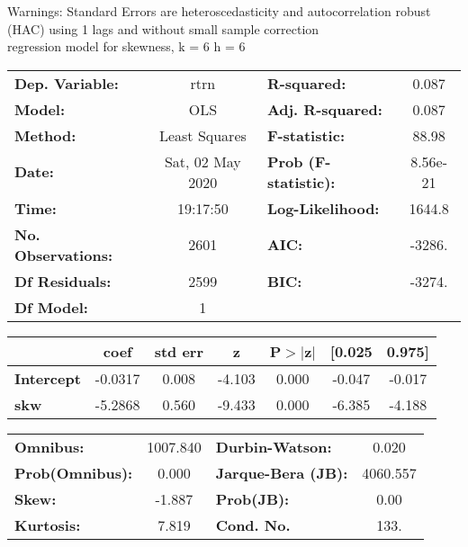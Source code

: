 Warnings: \newline
 [1] Standard Errors are heteroscedasticity and autocorrelation robust (HAC) using 1 lags and without small sample correction\\ 

regression model for skewness, k = 6 h = 6\begin{center}
\begin{tabular}{lclc}
\toprule
\textbf{Dep. Variable:}    &       rtrn       & \textbf{  R-squared:         } &     0.087   \\
\textbf{Model:}            &       OLS        & \textbf{  Adj. R-squared:    } &     0.087   \\
\textbf{Method:}           &  Least Squares   & \textbf{  F-statistic:       } &     88.98   \\
\textbf{Date:}             & Sat, 02 May 2020 & \textbf{  Prob (F-statistic):} &  8.56e-21   \\
\textbf{Time:}             &     19:17:50     & \textbf{  Log-Likelihood:    } &    1644.8   \\
\textbf{No. Observations:} &        2601      & \textbf{  AIC:               } &    -3286.   \\
\textbf{Df Residuals:}     &        2599      & \textbf{  BIC:               } &    -3274.   \\
\textbf{Df Model:}         &           1      & \textbf{                     } &             \\
\bottomrule
\end{tabular}
\begin{tabular}{lcccccc}
                   & \textbf{coef} & \textbf{std err} & \textbf{z} & \textbf{P$> |$z$|$} & \textbf{[0.025} & \textbf{0.975]}  \\
\midrule
\textbf{Intercept} &      -0.0317  &        0.008     &    -4.103  &         0.000        &       -0.047    &       -0.017     \\
\textbf{skw}       &      -5.2868  &        0.560     &    -9.433  &         0.000        &       -6.385    &       -4.188     \\
\bottomrule
\end{tabular}
\begin{tabular}{lclc}
\textbf{Omnibus:}       & 1007.840 & \textbf{  Durbin-Watson:     } &    0.020  \\
\textbf{Prob(Omnibus):} &   0.000  & \textbf{  Jarque-Bera (JB):  } & 4060.557  \\
\textbf{Skew:}          &  -1.887  & \textbf{  Prob(JB):          } &     0.00  \\
\textbf{Kurtosis:}      &   7.819  & \textbf{  Cond. No.          } &     133.  \\
\bottomrule
\end{tabular}
\end{center}

